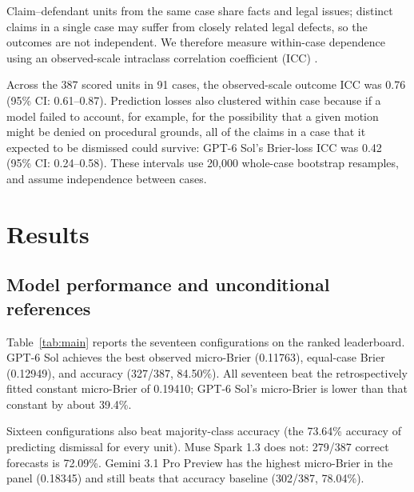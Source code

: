 \documentclass[11pt]{article}
\begin{document}
Claim--defendant units from the same case share facts and legal issues; distinct claims in a single case may suffer from closely related legal defects, so the outcomes are not independent. We therefore measure within-case dependence using an observed-scale intraclass correlation coefficient (ICC) \citep{makicc}.

Across the 387 scored units in 91 cases, the observed-scale outcome ICC was 0.76 (95\% CI: 0.61--0.87). Prediction losses also clustered within case because if a model failed to account, for example, for the possibility that a given motion might be denied on procedural grounds, all of the claims in a case that it expected to be dismissed could survive: GPT-6 Sol's Brier-loss ICC was 0.42 (95\% CI: 0.24--0.58). These intervals use 20,000 whole-case bootstrap resamples, and assume independence between cases.

\section{Results}

\subsection{Model performance and unconditional references}
Table~\ref{tab:main} reports the seventeen configurations on the ranked leaderboard. GPT-6 Sol achieves the best observed micro-Brier (0.11763), equal-case Brier (0.12949), and accuracy (327/387, 84.50\%). All seventeen beat the retrospectively fitted constant micro-Brier of 0.19410; GPT-6 Sol's micro-Brier is lower than that constant by about 39.4\%.

Sixteen configurations also beat majority-class accuracy (the 73.64\% accuracy of predicting dismissal for every unit). Muse Spark 1.3 does not: 279/387 correct forecasts is 72.09\%. Gemini 3.1 Pro Preview has the highest micro-Brier in the panel (0.18345) and still beats that accuracy baseline (302/387, 78.04\%).
\end{document}

